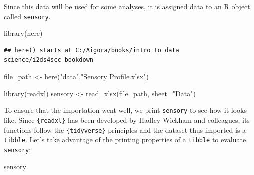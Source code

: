 \documentclass[
]{book}
\newenvironment{Shaded}{\begin{snugshade}}{\end{snugshade}}
\newcommand{\AttributeTok}[1]{\textcolor[rgb]{0.77,0.63,0.00}{#1}}
\newcommand{\FunctionTok}[1]{\textcolor[rgb]{0.00,0.00,0.00}{#1}}
\newcommand{\NormalTok}[1]{#1}
\newcommand{\OtherTok}[1]{\textcolor[rgb]{0.56,0.35,0.01}{#1}}
\newcommand{\StringTok}[1]{\textcolor[rgb]{0.31,0.60,0.02}{#1}}
\begin{document}
Since this data will be used for some analyses, it is assigned data to an R object called \texttt{sensory}.

\begin{Shaded}
\begin{Highlighting}[]
\FunctionTok{library}\NormalTok{(here)}
\end{Highlighting}
\end{Shaded}

\begin{verbatim}
## here() starts at C:/Aigora/books/intro to data science/i2ds4scc_bookdown
\end{verbatim}

\begin{Shaded}
\begin{Highlighting}[]
\NormalTok{file\_path }\OtherTok{\textless{}{-}} \FunctionTok{here}\NormalTok{(}\StringTok{"data"}\NormalTok{,}\StringTok{"Sensory Profile.xlsx"}\NormalTok{) }

\FunctionTok{library}\NormalTok{(readxl)}
\NormalTok{sensory }\OtherTok{\textless{}{-}} \FunctionTok{read\_xlsx}\NormalTok{(file\_path, }\AttributeTok{sheet=}\StringTok{"Data"}\NormalTok{)}
\end{Highlighting}
\end{Shaded}

To ensure that the importation went well, we print \texttt{sensory} to see how it looks like. Since \texttt{\{readxl\}} has been developed by Hadley Wickham and colleagues, its functions follow the \texttt{\{tidyverse\}} principles and the dataset thus imported is a \texttt{tibble}. Let's take advantage of the printing properties of a \texttt{tibble} to evaluate \texttt{sensory}:

\begin{Shaded}
\begin{Highlighting}[]
\NormalTok{sensory}
\end{Highlighting}
\end{Shaded}
\end{document}
